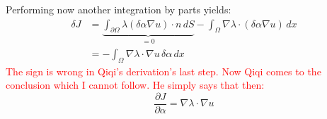\documentclass[10pt]{article}
\begin{document}
Performing now another integration by parts yields:
\begin{align}
\delta J &= \underbrace{\int_{\partial\Omega} \lambda \left( \delta\alpha \nabla  u \right)\cdot n \,dS}_{=0} - \int_{\Omega} \nabla\lambda \cdot \left( \delta\alpha \nabla u \right) \,dx\\
&= - \int_{\Omega} \nabla\lambda \cdot \nabla u \,\delta\alpha \,dx
\end{align}
\textcolor{red}{The sign is wrong in Qiqi's derivation's last step. Now Qiqi comes to the conclusion which I cannot follow. He simply says that then:}
\begin{equation}
\frac{\partial J}{\partial \alpha} = \nabla\lambda\cdot \nabla u
\end{equation}
\end{document}
